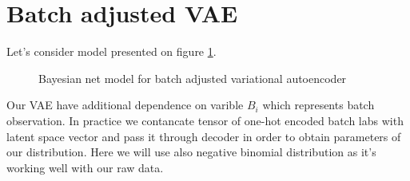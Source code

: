 \documentclass[12pt,a4paper]{article}
\begin{document}
\section{Batch adjusted VAE} 
Let's consider model presented on figure \ref{fig:VAE_batch}.
\begin{figure}[H]
    \centering
    \caption{Bayesian net model for batch adjusted variational autoencoder}
    \label{fig:VAE_batch}
    \centering
\end{figure} Our VAE have additional dependence on varible $B_i$ which represents batch observation. In practice we contancate tensor of one-hot encoded batch
labs with latent space vector and pass it through decoder in order to obtain parameters of our distribution. Here we will use also negative binomial distribution 
as it's working well with our raw data. 
\end{document}

